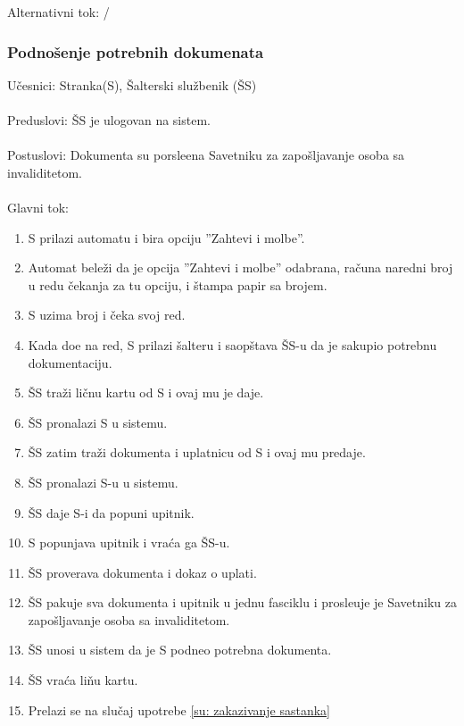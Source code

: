 \noindent Alternativni tok: /


\subsubsection{Podno\v senje potrebnih dokumenata}

\label{su: podnosenje dokumenata}
	
\noindent U\v cesnici: Stranka(S), \v Salterski slu\v zbenik (\v SS)
\\
\\ Preduslovi: \v SS je ulogovan na sistem.
\\
\\ Postuslovi: Dokumenta su porsle\dj ena Savetniku za zapo\v sljavanje osoba sa invaliditetom.
\\
\\ Glavni tok:
\begin{enumerate}
	\item S prilazi automatu i bira opciju ''Zahtevi i molbe''.
	\item Automat bele\v zi da je opcija ''Zahtevi i molbe'' odabrana, ra\v cuna naredni broj u redu \v cekanja za tu opciju, i \v stampa papir sa brojem.
	\item S uzima broj i \v ceka svoj red.
	\item Kada do\dj e na red, S prilazi \v salteru i saop\v stava \v SS-u da je sakupio potrebnu dokumentaciju.
	\item \v SS tra\v zi li\v cnu kartu od S i ovaj mu je daje.
	\item \v SS pronalazi S u sistemu.
	\item \v SS zatim tra\v zi dokumenta i uplatnicu od S i ovaj mu predaje.
	\item \v SS pronalazi S-u u sistemu.
	\item \v SS daje S-i da popuni upitnik.
	\item S popunjava upitnik i vra\' ca ga \v SS-u.
	\item \v SS proverava dokumenta i dokaz o uplati.
	\item \v SS pakuje sva dokumenta i upitnik u jednu fasciklu i prosle\dj uje je Savetniku za zapo\v sljavanje osoba sa invaliditetom.
	\item \v SS unosi u sistem da je S podneo potrebna dokumenta.
	\item \v SS vra\' ca li\v nu kartu.
	\item Prelazi se na slu\v caj upotrebe \ref{su: zakazivanje sastanka}
\end{enumerate}

